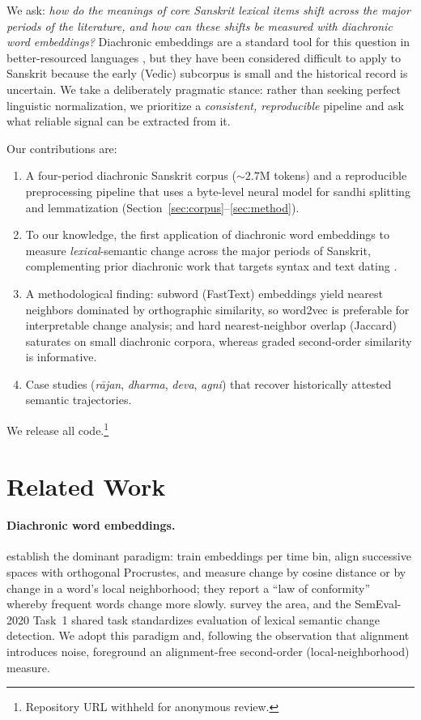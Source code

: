 \documentclass[11pt]{article}
\begin{document}
We ask: \emph{how do the meanings of core Sanskrit lexical items shift across the major periods of the literature, and how can these shifts be measured with diachronic word embeddings?} Diachronic embeddings are a standard tool for this question in better-resourced languages \citep{hamilton2016diachronic, kutuzov2018survey, schlechtweg2020semeval}, but they have been considered difficult to apply to Sanskrit because the early (Vedic) subcorpus is small and the historical record is uncertain. We take a deliberately pragmatic stance: rather than seeking perfect linguistic normalization, we prioritize a \emph{consistent, reproducible} pipeline and ask what reliable signal can be extracted from it.

Our contributions are:
\begin{enumerate}
  \item A four-period diachronic Sanskrit corpus (${\sim}2.7$M tokens) and a reproducible preprocessing pipeline that uses a byte-level neural model \citep{nehrdich2024byt5} for sandhi splitting and lemmatization (Section~\ref{sec:corpus}--\ref{sec:method}).
  \item To our knowledge, the first application of diachronic word embeddings to measure \emph{lexical}-semantic change across the major periods of Sanskrit, complementing prior diachronic work that targets syntax and text dating \citep{hellwig2020treebank}.
  \item A methodological finding: subword (FastText) embeddings yield nearest neighbors dominated by orthographic similarity, so word2vec is preferable for interpretable change analysis; and hard nearest-neighbor overlap (Jaccard) saturates on small diachronic corpora, whereas graded second-order similarity is informative.
  \item Case studies (\textit{r\=ajan}, \textit{dharma}, \textit{deva}, \textit{agni}) that recover historically attested semantic trajectories.
\end{enumerate}
We release all code.\footnote{Repository URL withheld for anonymous review.}

\section{Related Work}

\paragraph{Diachronic word embeddings.}
\citet{hamilton2016diachronic} establish the dominant paradigm: train embeddings per time bin, align successive spaces with orthogonal Procrustes, and measure change by cosine distance or by change in a word's local neighborhood; they report a ``law of conformity'' whereby frequent words change more slowly. \citet{kutuzov2018survey} survey the area, and the SemEval-2020 Task~1 shared task \citep{schlechtweg2020semeval} standardizes evaluation of lexical semantic change detection. We adopt this paradigm and, following the observation that alignment introduces noise, foreground an alignment-free second-order (local-neighborhood) measure.
\end{document}
